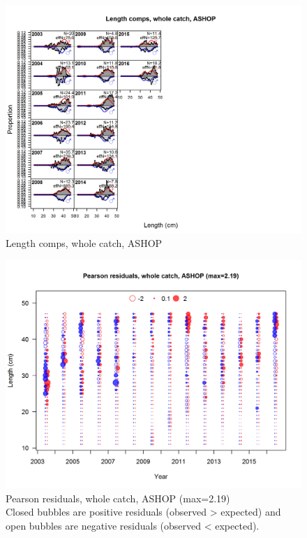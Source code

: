 \documentclass[12pt,]{article}
\begin{document}
\begin{figure}
\centering
\includegraphics{./r4ss/plots_mod1/comp_lenfit_flt2mkt0.png}
\caption{Length comps, whole catch, ASHOP
\label{fig:mod1_10_comp_lenfit_flt2mkt0}}
\end{figure}

\begin{figure}
\centering
\includegraphics{./r4ss/plots_mod1/comp_lenfit_residsflt2mkt0.png}
\caption{Pearson residuals, whole catch, ASHOP (max=2.19)\\
Closed bubbles are positive residuals (observed \textgreater{} expected)
and open bubbles are negative residuals (observed \textless{} expected).
\label{fig:mod1_11_comp_lenfit_residsflt2mkt0}}
\end{figure}
\end{document}
